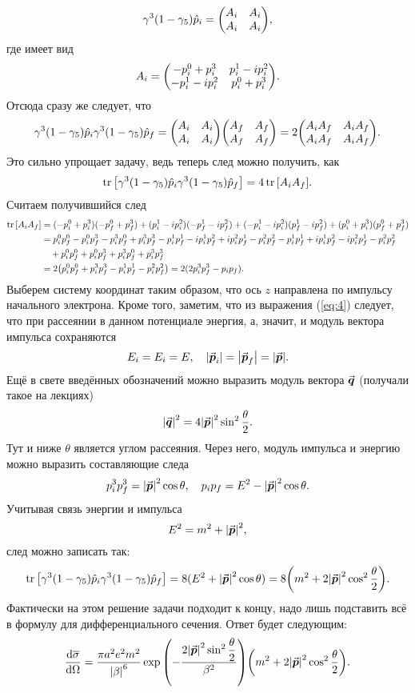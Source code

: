 \documentclass[12pt]{article}
\begin{document}
	$$ \gamma^3(1-\gamma_5)\hat{p}_i = \mqty(A_i & A_i \\ A_i & A_i), $$
	где имеет вид
	$$ A_i = \mqty(-p^0_i + p^3_i & p^1_i - ip^2_i \\ -p^1_i - ip^2_i & p^0_i + p^3_i).$$
	Отсюда сразу же следует, что 
	$$ \gamma^3(1-\gamma_5)\hat{p}_i \gamma^3(1-\gamma_5)\hat{p}_f = \mqty(A_i & A_i \\ A_i & A_i) \mqty(A_f & A_f \\ A_f & A_f) = 2 \mqty(A_i A_f &A_i A_f \\ A_i A_f & A_i A_f).$$
	Это сильно упрощает задачу, ведь теперь след можно получить, как
	$$ \tr\qty[\gamma^3(1-\gamma_5)\hat{p}_i \gamma^3(1-\gamma_5)\hat{p}_f] = 4 \tr\qty[A_i A_f]. $$
	Считаем получившийся след 
	\begin{equation*}
		\begin{split}
			\tr\qty[A_i A_f] &= (-p^0_i + p^3_i) (-p^0_f + p^3_f) + (p^1_i - ip^2_i) (-p^1_f - ip^2_f) + (-p^1_i - ip^2_i) (p^1_f - ip^2_f) + (p^0_i + p^3_i) (p^0_f + p^3_f)\\
			&= p^0_i p^0_f - p^0_i p^3_f - p^3_i p^0_f + p^3_i p^3_f - p^1_i p^1_f - i p^1_i p^2_f + i p^2_i p^1_f - p^2_i p^2_f - p^1_i p^1_f + ip^1_i p^2_f - ip^2_i p^1_f - p^2_i p^2_f\\
			&\quad+ p^0_i p^0_f + p^0_i p^3_f + p^3_i p^0_f + p^3_i p^3_f\\
			&= 2 \qty(p^0_i p^0_f + p^3_i p^3_f - p^1_i p^1_f - p^2_i p^2_f) = 2(2p^3_i p^3_f - p_ip_f). 
 		\end{split}
	\end{equation*}
	Выберем систему координат таким образом, что ось $z$ направлена по импульсу начального электрона. Кроме того, заметим, что из выражения (\ref{eq:4}) следует, что при рассеянии в данном потенциале энергия, а, значит, и модуль вектора импульса сохраняются
	$$ E_i = E_i = E,\quad \abs{\va*{p}_i} = \abs{\va*{p}_f} = \abs{\va*{p}}. $$
	Ещё в свете введённых обозначений можно выразить модуль вектора $\va*{q}$ (получали такое на лекциях)
	$$ \abs{\va*{q}}^2 = 4 \abs{\va*{p}}^2 \sin^2{\dfrac{\theta}{2}}. $$
	Тут и ниже $\theta$ является углом рассеяния. Через него, модуль импульса и энергию можно выразить составляющие следа
	$$ p^3_i p^3_f = \abs{\va*{p}}^2 \cos{\theta},\quad p_ip_f = E^2 - \abs{\va*{p}}^2 \cos{\theta}.$$
	Учитывая связь энергии и импульса
	$$ E^2 = m^2 + \abs{\va*{p}}^2, $$
	след можно записать так:
	$$ \tr\qty[\gamma^3(1-\gamma_5)\hat{p}_i \gamma^3(1-\gamma_5)\hat{p}_f] = 8 (E^2 + \abs{\va*{p}}^2 \cos{\theta}) = 8 \qty(m^2 + 2\abs{\va*{p}}^2 \cos^2{\dfrac\theta2}).$$
	Фактически на этом решение задачи подходит к концу, надо лишь подставить всё в формулу для дифференциального сечения. Ответ будет следующим:
	\begin{equation}
		\dv{\overline{\sigma}}{\Omega} = \dfrac{\pi a^2 e^2 m^2}{\abs{\beta}^6} \exp\qty(-\dfrac{2 \abs{\va*{p}}^2 \sin^2{\dfrac{\theta}{2}}}{\beta^2}) \qty(m^2 + 2\abs{\va*{p}}^2 \cos^2{\dfrac\theta2}).
	\end{equation}
	
\end{document}
